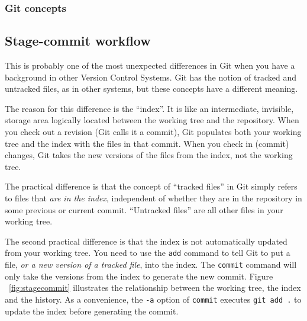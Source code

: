 \begin{frame}[fragile]
  \frametitle{Git concepts}


\end{frame}

\subsection{Stage-commit workflow}

This is probably one of the most unexpected differences in Git when
you have a background in other Version Control Systems. Git has the
notion of tracked and untracked files, as in other systems, but these
concepts have a different meaning.

The reason for this difference is the ``index''.
It is like an intermediate, invisible, storage area logically
located between the working tree and the repository.
When you check out a revision (Git calls it a commit), Git populates
both your working tree and the index with the files in that commit.
When you check in (commit) changes, Git takes the new versions of
the files from the index, not the working tree.

The practical difference is that the concept of ``tracked files''
in Git simply refers to files that \emph{are in the index},
independent of whether they are in the repository in some previous
or current commit.  ``Untracked files'' are all other files in your
working tree.

The second practical difference is that the index is not automatically
updated from your working tree. You need to use the \texttt{add}
command to tell Git to put a file, \emph{or a new version of a tracked
file}, into the index. The \texttt{commit} command will only take the
versions from the index to generate the new commit. Figure
~\ref{fig:stagecommit} illustrates the relationship between the
working tree, the index and the history.
As a convenience, the \texttt{-a} option of \texttt{commit}
executes \texttt{git add .} to update the index before generating
the commit.

